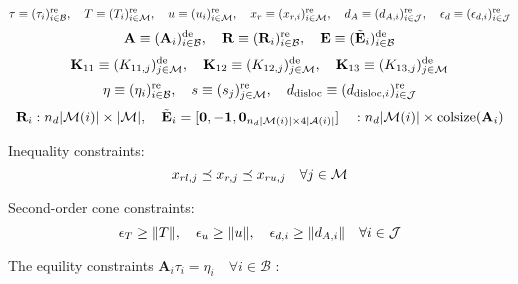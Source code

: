 \documentclass[a4paper,10pt]{article}
\begin{document}
\begin{equation}\notag
\tau \equiv (\tau_i)^\text{re}_{i \in \mathcal{B}}, \quad 
T          \equiv (T_i)^\text{re}_{i \in \mathcal{M}}, \quad 
u          \equiv (u_i)^\text{re}_{i \in \mathcal{M}}, \quad 
x_r        \equiv (x_{r,i})^\text{re}_{i \in \mathcal{M}}, \quad
d_A        \equiv (d_{A,i})^\text{re}_{i \in \mathcal{J}}, \quad 
\epsilon_d \equiv (\epsilon_{d,i})^\text{re}_{i \in \mathcal{J}}
\end{equation}
\begin{equation}\notag
\mathbf{A} \equiv (\mathbf{A}_i)^\text{de}_{i \in \mathcal{B}}, \quad
\mathbf{R} \equiv (\mathbf{R}_i)^\text{re}_{i \in \mathcal{B}}, \quad
\mathbf{E} \equiv (\tilde{\mathbf{E}}_i)^\text{de}_{i \in \mathcal{B}}
\end{equation}
\begin{equation}\notag
\mathbf{K}_{11} \equiv (K_{11,j})^{\text{de}}_{j \in \mathcal{M}}, \quad
\mathbf{K}_{12} \equiv (K_{12,j})^{\text{de}}_{j \in \mathcal{M}}, \quad
\mathbf{K}_{13} \equiv (K_{13,j})^{\text{de}}_{j \in \mathcal{M}}
\end{equation}
\begin{equation}\notag
\eta             \equiv (\eta_i)^\text{re}_{i \in \mathcal{B}}, \quad
s                \equiv (s_j)^{\text{re}}_{j \in \mathcal{M}}, \quad
d_\text{disloc}  \equiv (d_{\text{disloc},i})^{\text{re}}_{i \in \mathcal{J}}
\end{equation}
\begin{equation}\notag
\mathbf{R}_i : n_d | \mathcal{M}(i) | \times |\mathcal{M}|, \quad
\tilde{\mathbf{E}}_i = [\mathbf{0},-\mathbf{1},\mathbf{0}_{n_d | \mathcal{M}(i) | \times 4|\mathcal{A}(i)|}] \quad : n_d | \mathcal{M}(i) | \times \text{colsize}(\mathbf{A}_i)
\end{equation}

\noindent Inequality constraints:
\begin{equation}\notag
x_{rl,j} \preceq x_{r,j} \preceq x_{ru,j} \quad \forall j\in \mathcal{M}
\end{equation}

\noindent Second-order cone constraints:
\begin{equation}\notag
\epsilon_T \geq \| T \|, \quad \epsilon_u \geq \| u \|, \quad
\epsilon_{d,i} \geq \| d_{A,i} \| \quad \forall i \in \mathcal{J}
\end{equation}

\noindent The equility constraints $\mathbf{A}_i \tau_i = \eta_i \quad \forall i \in \mathcal{B}$ :
\end{document}
